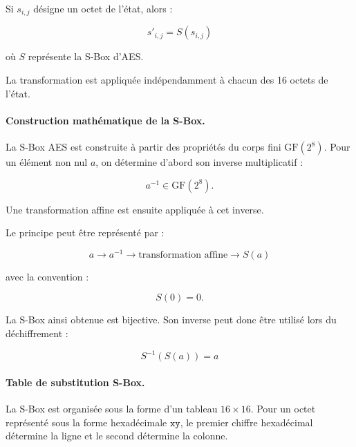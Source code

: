 \documentclass[12pt,a4paper]{article}
\begin{document}
Si $s_{i,j}$ désigne un octet de l'état, alors :

\[
\boxed{
s'_{i,j}=S(s_{i,j})
}
\]

où $S$ représente la S-Box d'AES.

La transformation est appliquée indépendamment à chacun des
16 octets de l'état.

\paragraph{Construction mathématique de la S-Box.}

La S-Box AES est construite à partir des propriétés du corps fini
$\mathrm{GF}(2^8)$. Pour un élément non nul $a$, on détermine d'abord
son inverse multiplicatif :

\[
a^{-1}\in\mathrm{GF}(2^8).
\]

Une transformation affine est ensuite appliquée à cet inverse.

Le principe peut être représenté par :

\[
\boxed{
a
\longrightarrow
a^{-1}
\longrightarrow
\text{transformation affine}
\longrightarrow
S(a)
}
\]

avec la convention :

\[
S(0)=0.
\]

La S-Box ainsi obtenue est bijective. Son inverse peut donc être
utilisé lors du déchiffrement :

\[
\boxed{
S^{-1}(S(a))=a
}
\]



\paragraph{Table de substitution S-Box.}

La S-Box est organisée sous la forme d'un tableau $16\times16$.
Pour un octet représenté sous la forme hexadécimale
$\texttt{xy}$, le premier chiffre hexadécimal détermine la ligne
et le second détermine la colonne.
\end{document}
